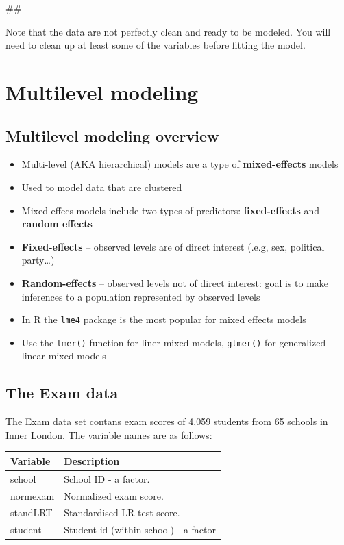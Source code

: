 \documentclass[]{book}
\newenvironment{Shaded}{\begin{snugshade}}{\end{snugshade}}
\newcommand{\NormalTok}[1]{#1}
\providecommand{\tightlist}{%
  \setlength{\itemsep}{0pt}\setlength{\parskip}{0pt}}
\begin{document}
\begin{Shaded}
\begin{Highlighting}[]
\NormalTok{## }
\end{Highlighting}
\end{Shaded}

Note that the data are not perfectly clean and ready to be modeled. You
will need to clean up at least some of the variables before fitting the
model.

\section{Multilevel modeling}\label{multilevel-modeling}

\subsection{Multilevel modeling
overview}\label{multilevel-modeling-overview}

\begin{itemize}
\tightlist
\item
  Multi-level (AKA hierarchical) models are a type of
  \textbf{mixed-effects} models
\item
  Used to model data that are clustered
\item
  Mixed-effecs models include two types of predictors:
  \textbf{fixed-effects} and \textbf{random effects}
\item
  \textbf{Fixed-effects} -- observed levels are of direct interest
  (.e.g, sex, political party\ldots{})
\item
  \textbf{Random-effects} -- observed levels not of direct interest:
  goal is to make inferences to a population represented by observed
  levels
\item
  In R the \texttt{lme4} package is the most popular for mixed effects
  models
\item
  Use the \texttt{lmer()} function for liner mixed models,
  \texttt{glmer()} for generalized linear mixed models
\end{itemize}

\subsection{The Exam data}\label{the-exam-data}

The Exam data set contans exam scores of 4,059 students from 65 schools
in Inner London. The variable names are as follows:

\begin{longtable}[]{@{}ll@{}}
\toprule
Variable & Description\tabularnewline
\midrule
\endhead
school & School ID - a factor.\tabularnewline
normexam & Normalized exam score.\tabularnewline
standLRT & Standardised LR test score.\tabularnewline
student & Student id (within school) - a factor\tabularnewline
\bottomrule
\end{longtable}
\end{document}
